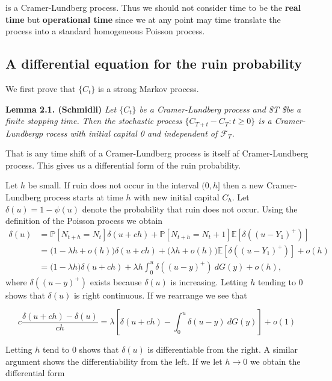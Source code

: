 \documentclass[a4paper,12pt,openany]{book}
\begin{document}
is a Cramer-Lundberg process. Thus we should not consider time to be the \textbf{real time} but \textbf{operational time} since we at any point may time translate the process into a standard homogeneous Poisson process.

\hypertarget{a-differential-equation-for-the-ruin-probability}{%
\subsection{A differential equation for the ruin probability}\label{a-differential-equation-for-the-ruin-probability}}

We first prove that \(\{C_t\}\) is a strong Markov process.

\textbf{Lemma 2.1. (Schmidli)} \emph{Let \(\{C_t\}\) be a Cramer-Lundberg process and \$T \$be a finite stopping time. Then the stochastic process \(\{C_{T+t}−C_T : t\ge 0\}\) is a Cramer-Lundbergp rocess with initial capital 0 and independent of \(\mathcal F_T\).}

That is any time shift of a Cramer-Lundberg process is itself af Cramer-Lundberg process. This gives us a differential form of the ruin probability.

Let \(h\) be small. If ruin does not occur in the interval \((0,h]\) then a new Cramer-Lundberg process starts at time \(h\) with new initial capital \(C_h\). Let \(\delta(u) = 1 − \psi(u)\) denote the probability that ruin does not occur. Using the definition of the Poisson process we obtain
\begin{align*}
\delta (u)&=\mathbb P[N_{t+h}=N_t]\delta(u+ch)+\mathbb P[N_{t+h}=N_t+1]\mathbb E[\delta((u-Y_1)^+)]\\
&=\Big(1-\lambda h+o(h)\Big)\delta(u+ch)+\Big(\lambda h + o(h)\Big)\mathbb E[\delta((u-Y_1)^+)]+o(h)\\
&=\Big(1-\lambda h\Big)\delta(u+ch)+\lambda h\int_0^u\delta((u-y)^+)\ dG(y)+o(h),
\end{align*}
where \(\delta((u-y)^+)\) exists because \(\delta(u)\) is increasing. Letting \(h\) tending to 0 shows that \(\delta(u)\) is right continuous. If we rearrange we see that

\[
c\frac{\delta(u+ch)-\delta(u)}{ch}=\lambda\left[\delta(u+ch)-\int_0^u\delta(u-y)\ dG(y)\right]+o(1)
\]

Letting \(h\) tend to 0 shows that \(\delta(u)\) is differentiable from the right. A similar argument shows the differentiability from the left. If we let \(h\to 0\) we obtain the differential form
\end{document}
